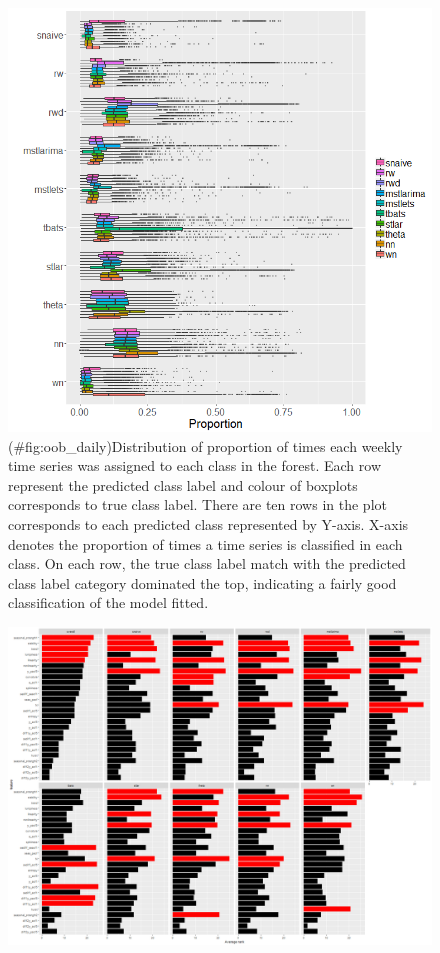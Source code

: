 \documentclass[11pt,a4paper,]{article}
\theoremstyle{definition}
\theoremstyle{definition}
\theoremstyle{definition}
\theoremstyle{remark}
\begin{document}
\begin{figure}
\centering
\includegraphics{figures/oob_daily-1.png}
\caption{(\#fig:oob\_daily)Distribution of proportion of times each
weekly time series was assigned to each class in the forest. Each row
represent the predicted class label and colour of boxplots corresponds
to true class label. There are ten rows in the plot corresponds to each
predicted class represented by Y-axis. X-axis denotes the proportion of
times a time series is classified in each class. On each row, the true
class label match with the predicted class label category dominated the
top, indicating a fairly good classification of the model fitted.}
\end{figure}

\newpage

\begin{figure}[h]

{\centering \includegraphics{figures/vi_daily-1} 

}

\end{figure}
\end{document}

